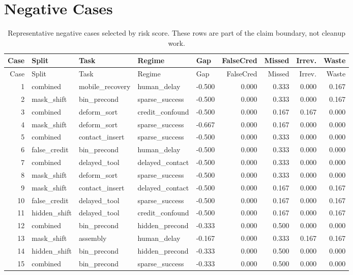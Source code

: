 \documentclass{article}
\begin{document}
\section{Negative Cases}
\begin{longtable}{@{}rllllrrrr@{}}
\caption{Representative negative cases selected by risk score. These rows are part of the claim boundary, not cleanup work.}\\
\toprule
Case & Split & Task & Regime & Gap & FalseCred & Missed & Irrev. & Waste\\
\midrule
\endfirsthead
\toprule
Case & Split & Task & Regime & Gap & FalseCred & Missed & Irrev. & Waste\\
\midrule
\endhead
1 & combined & mobile\_recovery & human\_delay & -0.500 & 0.000 & 0.333 & 0.000 & 0.167 \\
2 & mask\_shift & bin\_precond & sparse\_success & -0.500 & 0.000 & 0.333 & 0.000 & 0.167 \\
3 & combined & deform\_sort & credit\_confound & -0.500 & 0.000 & 0.167 & 0.167 & 0.000 \\
4 & mask\_shift & deform\_sort & sparse\_success & -0.667 & 0.000 & 0.167 & 0.000 & 0.000 \\
5 & combined & contact\_insert & sparse\_success & -0.500 & 0.000 & 0.333 & 0.000 & 0.000 \\
6 & false\_credit & bin\_precond & human\_delay & -0.500 & 0.000 & 0.333 & 0.000 & 0.000 \\
7 & combined & delayed\_tool & delayed\_contact & -0.500 & 0.000 & 0.333 & 0.000 & 0.000 \\
8 & mask\_shift & deform\_sort & sparse\_success & -0.500 & 0.000 & 0.333 & 0.000 & 0.000 \\
9 & mask\_shift & contact\_insert & delayed\_contact & -0.500 & 0.000 & 0.167 & 0.000 & 0.167 \\
10 & false\_credit & delayed\_tool & sparse\_success & -0.500 & 0.000 & 0.167 & 0.000 & 0.167 \\
11 & hidden\_shift & delayed\_tool & credit\_confound & -0.500 & 0.000 & 0.167 & 0.000 & 0.167 \\
12 & combined & bin\_precond & hidden\_precond & -0.333 & 0.000 & 0.500 & 0.000 & 0.000 \\
13 & mask\_shift & assembly & human\_delay & -0.167 & 0.000 & 0.333 & 0.167 & 0.167 \\
14 & hidden\_shift & bin\_precond & hidden\_precond & -0.333 & 0.000 & 0.500 & 0.000 & 0.000 \\
15 & combined & bin\_precond & sparse\_success & -0.333 & 0.000 & 0.500 & 0.000 & 0.000 \\

\end{longtable}
\end{document}

